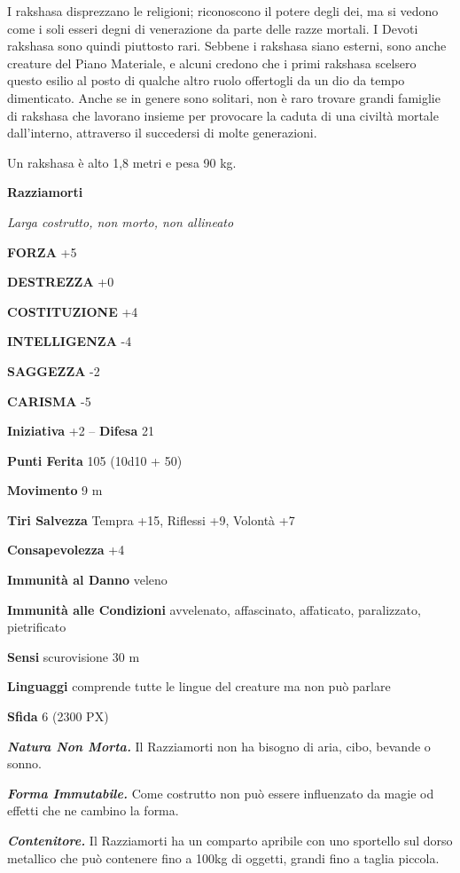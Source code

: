 \begin{multicols}{2}
I rakshasa disprezzano le religioni; riconoscono il potere degli dei, ma si vedono come i soli esseri degni di venerazione da parte delle razze mortali. I Devoti rakshasa sono quindi piuttosto rari. Sebbene i rakshasa siano esterni, sono anche creature del Piano Materiale, e alcuni credono che i primi rakshasa scelsero questo esilio al posto di qualche altro ruolo offertogli da un dio da tempo dimenticato. Anche se in genere sono solitari, non è raro trovare grandi famiglie di rakshasa che lavorano insieme per provocare la caduta di una civiltà mortale dall'interno, attraverso il succedersi di molte generazioni.

Un rakshasa è alto 1,8 metri e pesa 90 kg.

\medskip{}\textbf{Razziamorti}

\textit{Larga costrutto, non morto, non allineato}

\textbf{FORZA} +5

\textbf{DESTREZZA} +0

\textbf{COSTITUZIONE} +4

\textbf{INTELLIGENZA} -4

\textbf{SAGGEZZA} -2

\textbf{CARISMA} -5

\textbf{Iniziativa} +2 -- \textbf{Difesa} 21

\textbf{Punti Ferita} 105 (10d10 + 50)

\textbf{Movimento} 9 m

\textbf{Tiri Salvezza} Tempra +15, Riflessi +9, Volontà +7

\textbf{Consapevolezza} +4

\textbf{Immunità al Danno} veleno

\textbf{Immunità alle Condizioni} avvelenato, affascinato, affaticato, paralizzato, pietrificato

\textbf{Sensi} scurovisione 30 m

\textbf{Linguaggi} comprende tutte le lingue del creature ma non può parlare

\textbf{Sfida} 6 (2300 PX)

\textit{\textbf{Natura Non Morta.}} Il Razziamorti non ha bisogno di aria, cibo, bevande o sonno.

\textit{\textbf{Forma Immutabile.}} Come costrutto non può essere influenzato da magie od effetti che ne cambino la forma.

\textit{\textbf{Contenitore.}} Il Razziamorti ha un comparto apribile con uno sportello sul dorso metallico che può contenere fino a 100kg di oggetti, grandi fino a taglia piccola.


\end{multicols}
